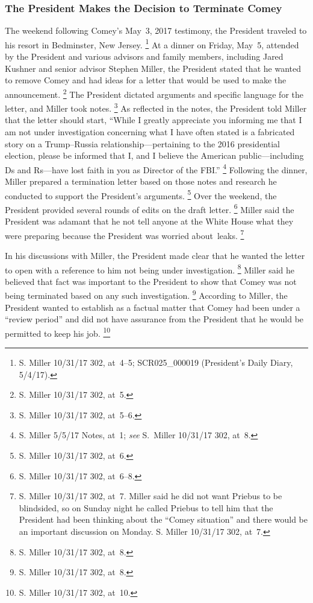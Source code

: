 \subsubsection{The President Makes the Decision to Terminate Comey}

The weekend following Comey's May~3, 2017 testimony, the President traveled to his resort in Bedminster, New Jersey.%
\footnote{S. Miller 10/31/17 302, at~4--5;
SCR025\_000019 (President's Daily Diary, 5/4/17).}
At a dinner on Friday, May~5, attended by the President and various advisors and family members, including Jared Kushner and senior advisor Stephen Miller, the President stated that he wanted to remove Comey and had ideas for a letter that would be used to make the announcement.%
\footnote{S. Miller 10/31/17 302, at~5.}
The President dictated arguments and specific language for the letter, and Miller took notes.%
\footnote{S. Miller 10/31/17 302, at~5--6.}
As reflected in the notes, the President told Miller that the letter should start, ``While I greatly appreciate you informing me that I am not under investigation concerning what I have often stated is a fabricated story on a Trump--Russia relationship---pertaining to the 2016 presidential election, please be informed that I, and I believe the American public---including Ds and Rs---have lost faith in you as Director of the FBI.''%
\footnote{S. Miller 5/5/17 Notes, at~1;
\textit{see} S.~Miller 10/31/17 302, at~8.}
Following the dinner, Miller prepared a termination letter based on those notes and research he conducted to support the President's arguments.%
\footnote{S. Miller 10/31/17 302, at~6.}
Over the weekend, the President provided several rounds of edits on the draft letter.%
\footnote{S. Miller 10/31/17 302, at~6--8.}
Miller said the President was adamant that he not tell anyone at the White House what they were preparing because the President was worried about~leaks.%
\footnote{S. Miller 10/31/17 302, at~7.
Miller said he did not want Priebus to be blindsided, so on Sunday night he called Priebus to tell him that the President had been thinking about the ``Comey situation'' and there would be an important discussion on Monday.
S. Miller 10/31/17 302, at~7.}

In his discussions with Miller, the President made clear that he wanted the letter to open with a reference to him not being under investigation.%
\footnote{S. Miller 10/31/17 302, at~8.}
Miller said he believed that fact was important to the President to show that Comey was not being terminated based on any such investigation.%
\footnote{S. Miller 10/31/17 302, at~8.}
According to Miller, the President wanted to establish as a factual matter that Comey had been under a ``review period'' and did not have assurance from the President that he would be permitted to keep his job.%
\footnote{S. Miller 10/31/17 302, at~10.}

